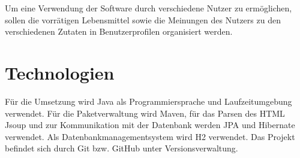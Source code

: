 Um eine Verwendung der Software durch verschiedene Nutzer zu ermöglichen, sollen die vorrätigen Lebensmittel sowie die Meinungen des Nutzers zu den verschiedenen Zutaten in Benutzerprofilen organisiert werden.

\section{Technologien}
Für die Umsetzung wird Java als Programmiersprache und Laufzeitumgebung verwendet. Für die Paketverwaltung wird Maven, für das Parsen des HTML Jsoup und zur Kommunikation mit der Datenbank werden JPA und Hibernate verwendet. Als Datenbankmanagementsystem wird H2 verwendet. Das Projekt befindet sich durch Git bzw. GitHub unter Versionsverwaltung.
